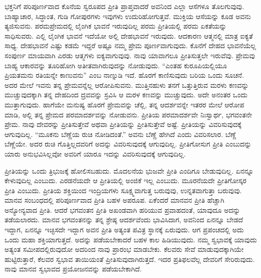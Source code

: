 ಭಕ್ತನಿಗೆ ಪರಿಪೂರ್ಣವಾದ ಕೊನೆಯ ಸ್ವರೂಪದ ಪ್ರೀತಿ ಪ್ರಾಪ್ತವಾದರೆ ಅವನಿಂದ ಎಲ್ಲಾ ಆಸೆಗಳೂ ತೊಲಗುವುವು. ಬಾಹ್ಯಾಚಾರ, ಸಿದ್ಧಾಂತ, ಗುಡಿ ಗೋಪುರಗಳು ಇವುಗಳು ಉದುರಿಹೋಗುತ್ತವೆ. ಮುಕ್ತಿಯ ಆಸೆಯನ್ನು ಕೂಡ ಅವನು ತ್ಯಜಿಸುವನು. ಪರಮಪ್ರೇಮದಲ್ಲಿ ಲೈಂಗಿಕ ಭಾವನೆ ಇರುವುದಿಲ್ಲ ಪರಮ ಪ್ರೀತಿಯಲ್ಲಿ ಪರಮ ಏಕತೆಯನ್ನು ಸಾಧಿಸುವರು. ಎಲ್ಲಿ ಲೈಂಗಿಕ ಭಾವನೆ ಇದೆಯೋ ಅಲ್ಲಿ ದೇಹಭಾವನೆ ಇರುವುದು. ಆದಕಾರಣ ಆತ್ಮನಲ್ಲಿ ಮಾತ್ರ ಐಕ್ಯತೆ ಸಾಧ್ಯ. ದೇಹಭಾವನೆ ಎಷ್ಟು ಕಡಮೆ ಇದ್ದರೆ ಅಷ್ಟೂ ನಮ್ಮ ಪ್ರೇಮ ಪೂರ್ಣವಾಗುವುದು. ಕೊನೆಗೆ ದೇಹದ ಭಾವನೆಯೆಲ್ಲ ಸಂಪುರ್ಣ ಮಾಯವಾಗಿ ಎರಡು ಆತ್ಮಗಳು ಐಕ್ಯವಾಗುವುವು. ನಾವು ಯಾವಾಗಲೂ ಪ್ರೀತಿಸುತ್ತಲೇ ಇರುವೆವು. ಪ್ರೇಮವು ಬಾಹ್ಯ ಆಕಾರವನ್ನು ತೂರಿಹೋಗಿ ಅತೀತವಾಗಿರುವುದನ್ನು ನೋಡುವುದು. “ಎಂತಹ ಕುರೂಪಿಯಲ್ಲಿಯೂ ಪ್ರಿಯತಮನು ರತಿಯನ್ನೇ ಕಾಣುವನು” ಎಂಬ ನಾಣ್ನುಡಿ ಇದೆ. ಹೊರಗೆ ಕಾಣಿಸುವುದು ಬರಿಯ ಒಂದು ಸೂಚನೆ. ಅದರ ಮೇಲೆ ಇವನು ತನ್ನ ಪ್ರೇಮವನ್ನೆಲ್ಲ ಆರೋಪಿಸುವನು. ಮುತ್ತಿನಹುಳು ತನಗೆ ಒತ್ತುತ್ತಿರುವ ಮರಳು ಕಣವನ್ನು ಮುಚ್ಚುವುದಕ್ಕಾಗಿ ತನ್ನ ದೇಹದಿಂದ ದ್ರವವನ್ನು ಸ್ರವಿಸಿ ಆ ಮರಳ ಕಣವನ್ನು ಮುಚ್ಚುವುದು. ಅದೇ ಅನಂತರ ಒಂದು ಮುತ್ತಾಗುವುದು. ಹಾಗೆಯೇ ಮನುಷ್ಯ ಹೊರಗೆ ಪ್ರೇಮವನ್ನು ಚೆಲ್ಲಿ, ತನ್ನ ಆದರ್ಶವನ್ನೇ ಇತರರ ಮೇಲೆ ಆರೋಪ ಮಾಡಿ, ಅಲ್ಲಿ ತನ್ನ ಪ್ರೇಮದ ಪರಮಾದರ್ಶವನ್ನು ನೋಡುವನು. ಪ್ರೀತಿಯ ಪರಮಾದರ್ಶವೇ ನಿಃಸ್ವಾರ್ಥ, ಭಗವಂತನೇ ಪ್ರೇಮ. ನಾವು ದೇವರನ್ನು ಪ್ರೀತಿಸುತ್ತೇವೆ ಅಥವಾ ಪ್ರೀತಿಯನ್ನು ಪ್ರೀತಿಸುತ್ತೇವೆ ಅಷ್ಟೆ. ಪ್ರೀತಿಯನ್ನು ವಿವರಿಸುವುದಕ್ಕೆ ಆಗುವುದಿಲ್ಲ. “ಮೂಕನು ಬೆಣ್ಣೆಯ ರುಚಿ ನೋಡಿದಂತೆ.” ಅವನು ಬೆಣ್ಣೆ ಹೇಗಿದೆ ಎಂದು ವಿವರಿಸಲಾರ. ಬೆಣ್ಣೆ ಬೆಣ್ಣೆಯೇ. ಅದರ ರುಚಿ ಗೊತ್ತಿಲ್ಲದವರಿಗೆ ಅದನ್ನು ವಿವರಿಸುವುದಕ್ಕೆ ಆಗುವುದಿಲ್ಲ. ಪ್ರೀತಿಗೋಸುಗ ಪ್ರೀತಿ ಎಂಬುದನ್ನು ಯಾರು ಅನುಭವಿಸಿಲ್ಲವೋ ಅವರಿಗೆ ಯಾರೂ ಇದನ್ನು ವಿವರಿಸುವುದಕ್ಕೆ ಆಗುವುದಿಲ್ಲ.

ಪ್ರೀತಿಯನ್ನು ಒಂದು ತ್ರಿಭುಜಕ್ಕೆ ಹೋಲಿಸಬಹುದು. ಮೊದಲನೆಯ ಭುಜವೇ ಪ್ರೀತಿ ಎಂದಿಗೂ ಬೇಡುವುದಿಲ್ಲ. ಏನನ್ನೂ ಕೇಳುವುದಿಲ್ಲ ಎಂಬುದು. ಎರಡನೆಯದೇ ಆ ಪ್ರೀತಿಯಲ್ಲಿ ಅಂಜಿಕೆ ಇಲ್ಲ ಎಂಬುದು. ಮೂರನೆಯದೇ ಪ್ರೀತಿಗೋಸ್ಕರ ಪ್ರೀತಿ ಎಂಬುದು. ಪ್ರೀತಿಯ ಶಕ್ತಿಯಿಂದ ಇಂದ್ರಿಯಗಳು ಸೂಕ್ಷ್ಮವಾಗುತ್ತ ಬರುವುವು, ಉನ್ನತವಾಗುತ್ತಾ ಬರುವುವು. ಮಾನವ ಸಂಬಂಧದಲ್ಲಿ ಪರಿಪೂರ್ಣವಾದ ಪ್ರೀತಿ ಬಹಳ ಅಪರೂಪ. ಏಕೆಂದರೆ ಮಾನವನ ಪ್ರೀತಿ ಹೆಚ್ಚಾಗಿ ಅನ್ಯೋನ್ಯವಾದ ಪ್ರೀತಿ. ಆದರೆ ಭಗವಂತನ ಪ್ರೀತಿ ಅಖಂಡವಾಗಿ ಹರಿಯುವ ಪ್ರವಾಹದಂತೆ, ಯಾವುದೂ ಅದನ್ನು ತಡೆಯಲಾರದು. ಮಾನವ ಭಗವಂತನನ್ನು ತನ್ನ ಶ್ರೇಷ್ಠ ಆದರ್ಶವೆಂದು ಭಾವಿಸಿದಾಗ, ಅವನಿಂದ ಏನನ್ನೂ ಬೇಡದೆ ಇದ್ದಾಗ, ಏನನ್ನೂ ಇಚ್ಛಿಸದೇ ಇದ್ದಾಗ ಅವನ ಪ್ರೀತಿ ಅತ್ಯಂತ ಪವಿತ್ರ ಸ್ಥಾನಕ್ಕೆ ಏರುವುದು. ಆಗ ಪ್ರಪಂಚದಲ್ಲಿ ಅದು ಒಂದು ಮಹಾ ಶಕ್ತಿಯಾಗುತ್ತದೆ. ಅದನ್ನು ಪಡೆಯಬೇಕಾದರೆ ಬಹಳ ಕಾಲ ಹಿಡಿಯುವುದು. ನಮ್ಮ ಸ್ವಭಾವಕ್ಕೆ ಯಾವುದು ಅತ್ಯಂತ ಸಮೀಪದಲ್ಲಿರುವುದೋ ಅದರಿಂದ ನಾವು ಪ್ರಾರಂಭ ಮಾಡಬೇಕು. ಕೆಲವರು ಸೇವೆ ಮಾಡುವುದಕ್ಕಾಗಿಯೇ ಹುಟ್ಟಿರುತ್ತಾರೆ, ಕೆಲವರ ಸ್ವಭಾವ ತಾಯಿಯಂತೆ ಪ್ರೀತಿಸುವುದಾಗಿರುತ್ತದೆ. ಇದರ ಪ್ರತಿಫಲವೆಲ್ಲ ದೇವರಿಗೆ ಸೇರಿರುವುದು. ನಾವು ಮಾನವ ಸ್ವಭಾವದ ಪ್ರಯೋಜನವನ್ನು ಪಡೆಯಬೇಕಾಗಿದೆ.

